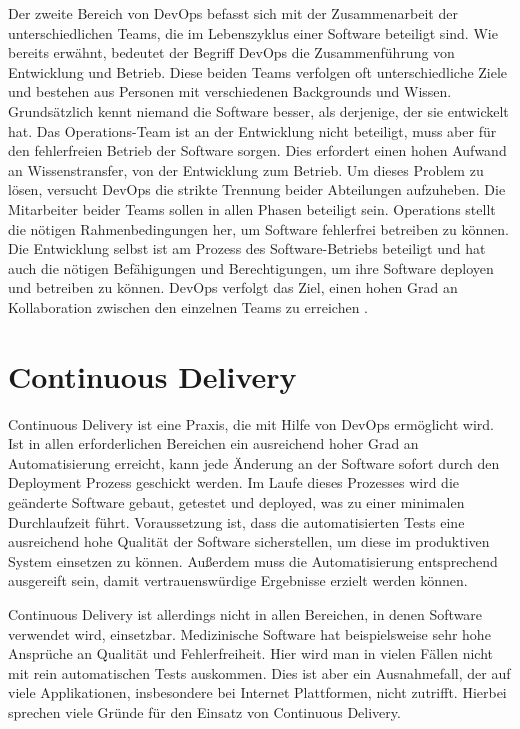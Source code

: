 Der zweite Bereich von DevOps befasst sich mit der Zusammenarbeit der unterschiedlichen Teams, die im Lebenszyklus einer Software beteiligt sind. Wie bereits erwähnt, bedeutet der Begriff DevOps die Zusammenführung von Entwicklung und Betrieb. Diese beiden Teams verfolgen oft unterschiedliche Ziele und bestehen aus Personen mit verschiedenen Backgrounds und Wissen. Grundsätzlich kennt niemand die Software besser, als derjenige, der sie entwickelt hat. Das Operations-Team ist an der Entwicklung nicht beteiligt, muss aber für den fehlerfreien Betrieb der Software sorgen. Dies erfordert einen hohen Aufwand an Wissenstransfer, von der Entwicklung zum Betrieb. Um dieses Problem zu lösen, versucht DevOps die strikte Trennung beider Abteilungen aufzuheben. Die Mitarbeiter beider Teams sollen in allen Phasen beteiligt sein. Operations stellt die nötigen Rahmenbedingungen her, um Software fehlerfrei betreiben zu können. Die Entwicklung selbst ist am Prozess des Software-Betriebs beteiligt und hat auch die nötigen Befähigungen und Berechtigungen, um ihre Software deployen und betreiben zu können. DevOps verfolgt das Ziel, einen hohen Grad an Kollaboration zwischen den einzelnen Teams zu erreichen \cite{walls2013}.

\section{Continuous Delivery}
Continuous Delivery ist eine Praxis, die mit Hilfe von DevOps ermöglicht wird. Ist in allen erforderlichen Bereichen ein ausreichend hoher Grad an Automatisierung erreicht, kann jede Änderung an der Software sofort durch den Deployment Prozess geschickt werden. Im Laufe dieses Prozesses wird die geänderte Software gebaut, getestet und deployed, was zu einer minimalen Durchlaufzeit führt. Voraussetzung ist, dass die automatisierten Tests eine ausreichend hohe Qualität der Software sicherstellen, um diese im produktiven System einsetzen zu können. Außerdem muss die Automatisierung entsprechend ausgereift sein, damit vertrauenswürdige Ergebnisse erzielt werden können.

Continuous Delivery ist allerdings nicht in allen Bereichen, in denen Software verwendet wird, einsetzbar. Medizinische Software hat beispielsweise sehr hohe Ansprüche an Qualität und Fehlerfreiheit. Hier wird man in vielen Fällen nicht mit rein automatischen Tests auskommen. Dies ist aber ein Ausnahmefall, der auf viele Applikationen, insbesondere bei Internet Plattformen, nicht zutrifft. Hierbei sprechen viele Gründe für den Einsatz von Continuous Delivery.